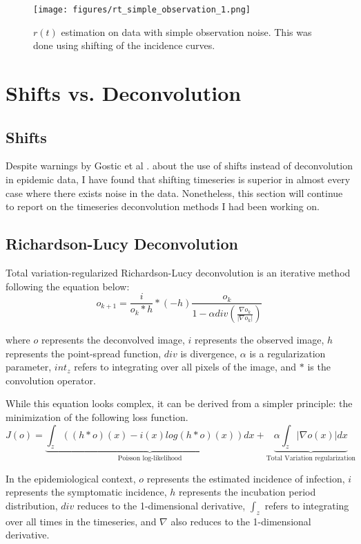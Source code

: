 \documentclass{article}
\begin{document}
\begin{figure}[h!]
    \centering
    \texttt{[image: figures/rt\_simple\_observation\_1.png]}
    \caption{$r(t)$ estimation on data with simple observation noise. This was done using shifting of the incidence curves.}
\end{figure}


\section{Shifts vs. Deconvolution}

\subsection{Shifts}
Despite warnings by Gostic et al \cite{Gostic}. about the use of shifts instead of deconvolution in epidemic data, I have found that shifting timeseries is superior in almost every case where there exists noise in the data. Nonetheless, this section will continue to report on the timeseries deconvolution methods I had been working on.


\subsection{Richardson-Lucy Deconvolution}
Total variation-regularized Richardson-Lucy deconvolution is an iterative method following the equation below: \cite{RLLoss}
\begin{equation}
    o_{k+1} = \frac{i}{o_k * h} * (-h) \frac{o_k}{1-\alpha div(\frac{\nabla o_k}{|\nabla o_k|})}
\end{equation}

where $o$ represents the deconvolved image, $i$ represents the observed image, $h$ represents the point-spread function, $div$ is divergence, $\alpha$ is a regularization parameter, $int_z$ refers to integrating over all pixels of the image, and $*$ is the convolution operator.

While this equation looks complex, it can be derived from a simpler principle: the minimization of the following loss function. 
\begin{equation}
    J(o) = \underbrace{\int_z ((h*o)(x) - i(x) log(h*o)(x))dx}_{\mbox{Poisson log-likelihood}} + \underbrace{\alpha \int_z |\nabla o(x)| dx}_{\mbox{Total Variation regularization}}
\end{equation}


In the epidemiological context, $o$ represents the estimated incidence of infection, $i$ represents the symptomatic incidence, $h$ represents the incubation period distribution, $div$ reduces to the 1-dimensional derivative,  $\int_z$ refers to integrating over all times in the timeseries, and $\nabla$ also reduces to the 1-dimensional derivative.
\end{document}
